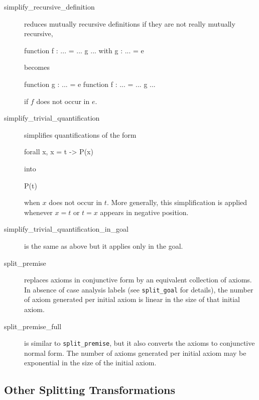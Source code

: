 \begin{description}
\item[simplify\_recursive\_definition] reduces mutually recursive
  definitions if they are not really mutually recursive, \eg
\begin{whycode}
function f : ... = ... g ...
with g : ... = e
\end{whycode}
becomes
\begin{whycode}
function g : ... = e
function f : ... = ... g ...
\end{whycode}
if $f$ does not occur in $e$.

\item[simplify\_trivial\_quantification]
  simplifies quantifications of the form
\begin{whycode}
forall x, x = t -> P(x)
\end{whycode}
into
\begin{whycode}
P(t)
\end{whycode}
  when $x$ does not occur in $t$.
  More generally, this simplification is applied whenever $x=t$ or
  $t=x$ appears in negative position.

\item[simplify\_trivial\_quantification\_in\_goal]
  is the same as above but it applies only in the goal.

\item[split\_premise] replaces axioms in conjunctive form
  by an equivalent collection of axioms.
  In absence of case analysis labels (see \texttt{split\_goal} for details),
  the number of axiom generated per initial axiom is
  linear in the size of that initial axiom.

\item[split\_premise\_full] is similar to \texttt{split\_premise}, but it
  also converts the axioms to conjunctive normal form. The number of
  axioms generated per initial axiom may be exponential in the size of
  the initial axiom.

\end{description}

\subsection{Other Splitting Transformations}
\label{tech:trans:split}

